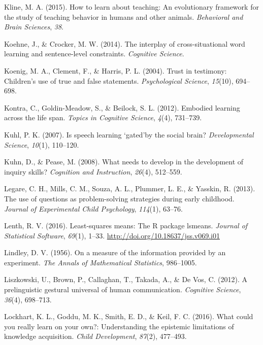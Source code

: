 \documentclass[oneside]{report}
\begin{document}
\hypertarget{ref-kline2015learn}{}
Kline, M. A. (2015). How to learn about teaching: An evolutionary
framework for the study of teaching behavior in humans and other
animals. \emph{Behavioral and Brain Sciences}, \emph{38}.

\hypertarget{ref-koehne2014interplay}{}
Koehne, J., \& Crocker, M. W. (2014). The interplay of cross-situational
word learning and sentence-level constraints. \emph{Cognitive Science}.

\hypertarget{ref-koenig2004trust}{}
Koenig, M. A., Clement, F., \& Harris, P. L. (2004). Trust in testimony:
Children's use of true and false statements. \emph{Psychological
Science}, \emph{15}(10), 694--698.

\hypertarget{ref-kontra2012embodied}{}
Kontra, C., Goldin-Meadow, S., \& Beilock, S. L. (2012). Embodied
learning across the life span. \emph{Topics in Cognitive Science},
\emph{4}(4), 731--739.

\hypertarget{ref-kuhl2007speech}{}
Kuhl, P. K. (2007). Is speech learning `gated'by the social brain?
\emph{Developmental Science}, \emph{10}(1), 110--120.

\hypertarget{ref-kuhn2008needs}{}
Kuhn, D., \& Pease, M. (2008). What needs to develop in the development
of inquiry skills? \emph{Cognition and Instruction}, \emph{26}(4),
512--559.

\hypertarget{ref-legare2013use}{}
Legare, C. H., Mills, C. M., Souza, A. L., Plummer, L. E., \& Yasskin,
R. (2013). The use of questions as problem-solving strategies during
early childhood. \emph{Journal of Experimental Child Psychology},
\emph{114}(1), 63--76.

\hypertarget{ref-lenth2016lsmeans}{}
Lenth, R. V. (2016). Least-squares means: The R package lsmeans.
\emph{Journal of Statistical Software}, \emph{69}(1), 1--33.
\url{http://doi.org/10.18637/jss.v069.i01}

\hypertarget{ref-lindley1956measure}{}
Lindley, D. V. (1956). On a measure of the information provided by an
experiment. \emph{The Annals of Mathematical Statistics}, 986--1005.

\hypertarget{ref-liszkowski2012prelinguistic}{}
Liszkowski, U., Brown, P., Callaghan, T., Takada, A., \& De Vos, C.
(2012). A prelinguistic gestural universal of human communication.
\emph{Cognitive Science}, \emph{36}(4), 698--713.

\hypertarget{ref-lockhart2016could}{}
Lockhart, K. L., Goddu, M. K., Smith, E. D., \& Keil, F. C. (2016). What
could you really learn on your own?: Understanding the epistemic
limitations of knowledge acquisition. \emph{Child Development},
\emph{87}(2), 477--493.
\end{document}
